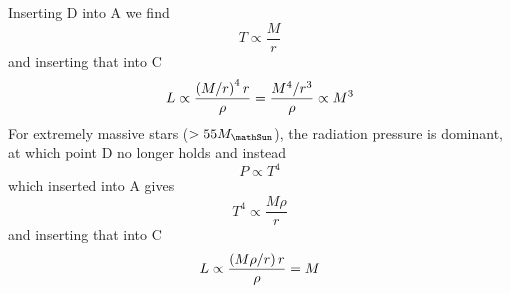 Inserting D into A we find
\begin{equation}
	T \propto \frac{M}{r}
\end{equation}
and inserting that into C
\begin{equation}
	L\propto\frac{\left(M/r\right)^4r}{\rho}=\frac{M^4/r^3}{\rho} \propto M^3
\end{equation}
For extremely massive stars (\(>55M_\mathSun \)), the radiation pressure is dominant, at which point D no longer holds and instead
\begin{equation}
	P \propto T^4
\end{equation}
which inserted into A gives
\begin{equation}
	T^4 \propto \frac{M\rho}{r}
\end{equation}
and inserting that into C
\begin{equation}
	L \propto \frac{\left(M\rho/r\right)r}{\rho}=M
\end{equation}
